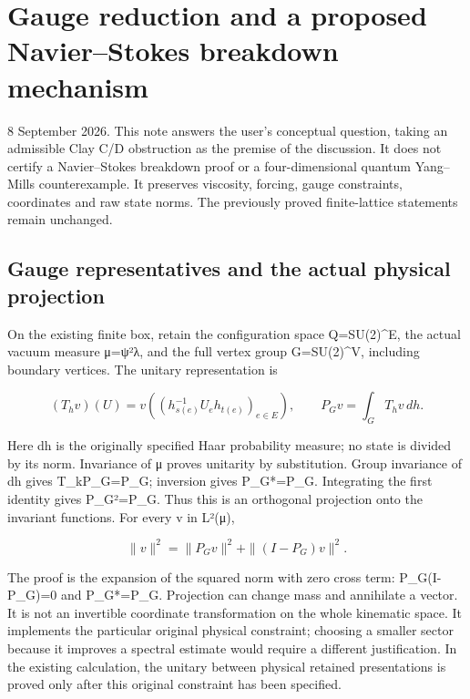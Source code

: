 \section{Gauge reduction and a proposed Navier--Stokes breakdown
mechanism}\label{gauge-and-navier-stokes-bridge-md-gauge-reduction-and-a-proposed-navierstokes-breakdown-mechanism}

8 September 2026. This note answers the user's conceptual question,
taking an admissible Clay C/D obstruction as the premise of the
discussion. It does not certify a Navier--Stokes breakdown proof or a
four-dimensional quantum Yang--Mills counterexample. It preserves
viscosity, forcing, gauge constraints, coordinates and raw state norms.
The previously proved finite-lattice statements remain unchanged.

\subsection{Gauge representatives and the actual physical
projection}\label{gauge-and-navier-stokes-bridge-md-gauge-representatives-and-the-actual-physical-projection}

On the existing finite box, retain the configuration space Q=SU(2)\^{}E,
the actual vacuum measure μ=ψ²λ, and the full vertex group G=SU(2)\^{}V,
including boundary vertices. The unitary representation is

\[
(T_hv)(U)=v((h_{s(e)}^{-1}U_eh_{t(e)})_{e\in E}),\qquad
P_Gv=\int_G T_hv\,dh.
\]

Here dh is the originally specified Haar probability measure; no state
is divided by its norm. Invariance of μ proves unitarity by
substitution. Group invariance of dh gives T\_kP\_G=P\_G; inversion
gives P\_G*=P\_G. Integrating the first identity gives P\_G²=P\_G. Thus
this is an orthogonal projection onto the invariant functions. For every
v in L²(μ),

\[
\|v\|^2=\|P_Gv\|^2+\|(I-P_G)v\|^2.
\]

The proof is the expansion of the squared norm with zero cross term:
P\_G(I-P\_G)=0 and P\_G*=P\_G. Projection can change mass and annihilate
a vector. It is not an invertible coordinate transformation on the whole
kinematic space. It implements the particular original physical
constraint; choosing a smaller sector because it improves a spectral
estimate would require a different justification. In the existing
calculation, the unitary between physical retained presentations is
proved only after this original constraint has been specified.

